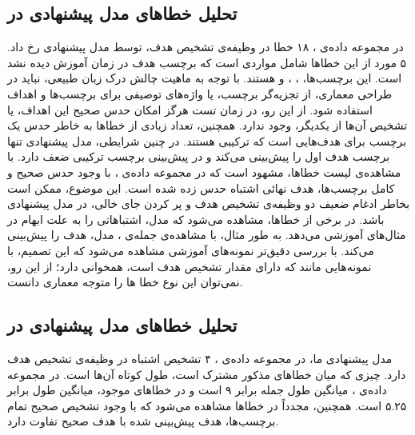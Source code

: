 \subsection{تحلیل خطاها‌ی مدل پیشنهادی در }
در مجموعه داده‌ی ، ۱۸ خطا در وظیفه‌ی تشخیص هدف، توسط مدل پیشنهادی رخ داد. ۵ مورد از این خطاها شامل مواردی است که برچسب هدف در زمان آموزش دیده نشد است. این برچسب‌ها، ، ،  و  هستند. با توجه به ماهیت چالش درک زبان طبیعی، نباید در طراحی معماری، از تجزیه‌گر برچسب، یا واژه‌های توصیفی برای برچسب‌ها و اهداف استفاده شود. از این رو، در زمان تست هرگز امکان حدس صحیح این اهداف، یا تشخیص آن‌ها از یکدیگر، وجود ندارد. همچنین، تعداد زیادی از خطاها به خاطر حدس یک برچسب برای هدف‌هایی است که ترکیبی هستند. در چنین شرایطی، مدل پیشنهادی تنها برچسب هدف اول را پیش‌بینی می‌کند و در پیش‌بینی برچسب ترکیبی ضعف دارد. با مشاهده‌ی لیست خطاها، مشهود است که در مجموعه داده‌ی ، با وجود حدس صحیح و کامل برچسب‌ها، هدف نهائی اشتباه حدس زده شده است. این موضوع، ممکن است بخاطر ادغام ضعیف دو وظیفه‌ی تشخیص هدف و پر کردن جای خالی، در مدل پیشنهادی باشد. در برخی از خطاها، مشاهده می‌شود که مدل، اشتباهاتی را به علت ابهام در مثال‌های آموزشی می‌دهد. به طور مثال، با مشاهده‌ی جمله‌ی ، مدل، هدف  را پیش‌بینی می‌کند. با بررسی دقیق‌تر نمونه‌های آموزشی مشاهده می‌شود که این تصمیم،  با نمونه‌هایی مانند  که دارای مقدار تشخیص هدف  است، همخوانی دارد؛ از این رو، نمی‌توان این نوع خطا ها را متوجه معماری دانست.
\subsection{تحلیل خطاهای مدل پیشنهادی در }
مدل پیشنهادی ما، در مجموعه داده‌ی ، ۴ تشخیص اشتباه در وظیفه‌ی تشخیص هدف دارد. چیزی که میان خطاهای مذکور مشترک است، طول کوتاه آن‌ها است. در مجموعه داده‌ی ، میانگین طول جمله برابر ۹ است و در خطاهای موجود، میانگین طول برابر ۵‍.‍۲۵ است. همچنین، مجدداً در خطاها مشاهده می‌شود که با وجود تشخیص صحیح تمام برچسب‌ها، هدف پیش‌بینی شده با هدف صحیح تفاوت دارد.